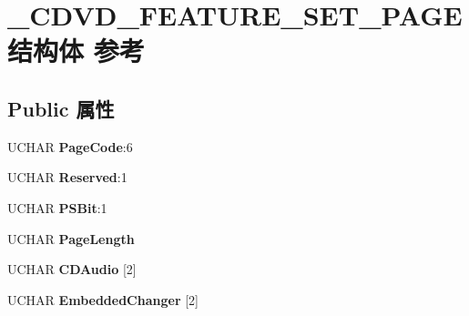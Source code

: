 \hypertarget{struct___c_d_v_d___f_e_a_t_u_r_e___s_e_t___p_a_g_e}{}\section{\+\_\+\+C\+D\+V\+D\+\_\+\+F\+E\+A\+T\+U\+R\+E\+\_\+\+S\+E\+T\+\_\+\+P\+A\+G\+E结构体 参考}
\label{struct___c_d_v_d___f_e_a_t_u_r_e___s_e_t___p_a_g_e}
\subsection*{Public 属性}
\begin{DoxyCompactItemize}
\item 
\mbox{\label{struct___c_d_v_d___f_e_a_t_u_r_e___s_e_t___p_a_g_e_a6000720d5a9b017821cbbce5b1ced5e7}} 
U\+C\+H\+AR {\bfseries Page\+Code}\+:6
\item 
\mbox{\label{struct___c_d_v_d___f_e_a_t_u_r_e___s_e_t___p_a_g_e_ac58b56b0688e0f7a1eb725edddd1f278}} 
U\+C\+H\+AR {\bfseries Reserved}\+:1
\item 
\mbox{\label{struct___c_d_v_d___f_e_a_t_u_r_e___s_e_t___p_a_g_e_ad4af0987df5c91f9182b451bea7fd486}} 
U\+C\+H\+AR {\bfseries P\+S\+Bit}\+:1
\item 
\mbox{\label{struct___c_d_v_d___f_e_a_t_u_r_e___s_e_t___p_a_g_e_a2900c377c6600634c8aa0e361248cacd}} 
U\+C\+H\+AR {\bfseries Page\+Length}
\item 
\mbox{\label{struct___c_d_v_d___f_e_a_t_u_r_e___s_e_t___p_a_g_e_adbf7709c87cc61e525e29183baa0ca74}} 
U\+C\+H\+AR {\bfseries C\+D\+Audio} \mbox{[}2\mbox{]}
\item 
\mbox{\label{struct___c_d_v_d___f_e_a_t_u_r_e___s_e_t___p_a_g_e_aff86f3a8eb2ae160e9b022fde48eed9c}} 
U\+C\+H\+AR {\bfseries Embedded\+Changer} \mbox{[}2\mbox{]}
\item 
\mbox{\label{struct___c_d_v_d___f_e_a_t_u_r_e___s_e_t___p_a_g_e_a81b86e389a472fe40c3e9aab5f5f8772}} 

\end{DoxyCompactItemize}

